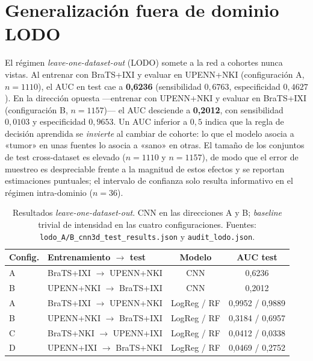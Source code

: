\section{Generalización fuera de dominio LODO}

El régimen \emph{leave-one-dataset-out} (LODO) somete a la red a cohortes nunca
vistas. Al entrenar con BraTS+IXI y evaluar en UPENN+NKI (configuración A,
$n=1110$), el AUC en test cae a \textbf{0,6236} (sensibilidad $0{,}6763$,
especificidad $0{,}4627$). En la dirección opuesta ---entrenar con UPENN+NKI y
evaluar en BraTS+IXI (configuración B, $n=1157$)--- el AUC desciende a
\textbf{0,2012}, con sensibilidad $0{,}0103$ y especificidad $0{,}9653$. Un AUC
inferior a $0{,}5$ indica que la regla de decisión aprendida se \emph{invierte}
al cambiar de cohorte: lo que el modelo asocia a «tumor» en unas fuentes lo
asocia a «sano» en otras. El tamaño de los conjuntos de test cross-dataset es
elevado ($n=1110$ y $n=1157$), de modo que el error de muestreo es despreciable
frente a la magnitud de estos efectos y se reportan estimaciones puntuales; el
intervalo de confianza solo resulta informativo en el régimen intra-dominio
($n=36$).

\begin{table}[ht]
  \centering
  \caption[Resultados de validación cruzada LODO]{Resultados \emph{leave-one-dataset-out}.
  CNN en las direcciones A y B; \emph{baseline} trivial de intensidad en las
  cuatro configuraciones. Fuentes: \texttt{lodo\_A/B\_cnn3d\_test\_results.json}
  y \texttt{audit\_lodo.json}.}
  \label{tab:lodo_resultados}
  \begin{tabular}{l l c c}
    \hline
    \textbf{Config.} & \textbf{Entrenamiento $\rightarrow$ test} & \textbf{Modelo} & \textbf{AUC test} \\
    \hline
    A & BraTS+IXI $\rightarrow$ UPENN+NKI & CNN              & 0,6236 \\
    B & UPENN+NKI $\rightarrow$ BraTS+IXI & CNN              & 0,2012 \\
    A & BraTS+IXI $\rightarrow$ UPENN+NKI & LogReg / RF      & 0,9952 / 0,9889 \\
    B & UPENN+NKI $\rightarrow$ BraTS+IXI & LogReg / RF      & 0,3184 / 0,6957 \\
    C & BraTS+NKI $\rightarrow$ UPENN+IXI & LogReg / RF      & 0,0412 / 0,0338 \\
    D & UPENN+IXI $\rightarrow$ BraTS+NKI & LogReg / RF      & 0,0469 / 0,2752 \\
    \hline
  \end{tabular}
\end{table}


